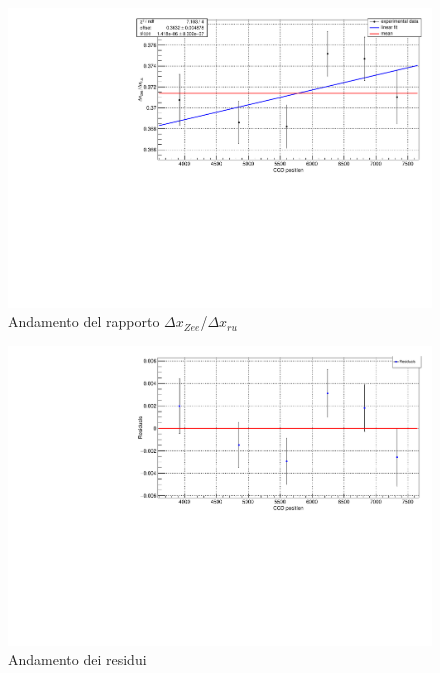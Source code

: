 \documentclass{article}
\begin{document}
	\begin{center}
		\begin{figure}[H]
			\centering
			\includegraphics[scale=0.38, angle=0]{campomax/fit.pdf}
			\caption{Andamento del rapporto $\Delta x_{Zee}$/$\Delta x_{ru}$}
			\label{fig:fit_rapporto}
		\end{figure}
	\end{center}

	\begin{center}
		\begin{figure}[H]
			\centering
			\includegraphics[scale=0.38, angle=0]{campomax/residuals.pdf}
			\caption{Andamento dei residui}
			\label{fig:fit_rapporto_res}
		\end{figure}
	\end{center}
\end{document}
